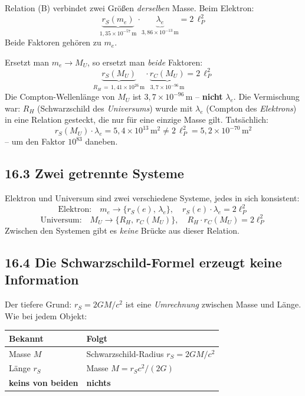 Relation (B) verbindet zwei Größen \emph{derselben} Masse. Beim Elektron:
\[
  \underbrace{r_S(m_e)}_{1{,}35\times10^{-57}\,\text{m}}
  \cdot
  \underbrace{\lambda_e}_{3{,}86\times10^{-13}\,\text{m}}
  = 2\,\ell_P^2
\]
Beide Faktoren gehören zu $m_e$.

Ersetzt man $m_e \to M_U$, so ersetzt man \emph{beide} Faktoren:
\[
  \underbrace{r_S(M_U)}_{R_H \,=\, 1{,}41\times10^{26}\,\text{m}}
  \cdot
  \underbrace{r_C(M_U)}_{3{,}7\times10^{-96}\,\text{m}}
  = 2\,\ell_P^2
\]
Die Compton-Wellenlänge von $M_U$ ist $3{,}7\times10^{-96}$\,m --
\textbf{nicht} $\lambda_e$. Die Vermischung war: $R_H$ (Schwarzschild
des \emph{Universums}) wurde mit $\lambda_e$ (Compton des
\emph{Elektrons}) in eine Relation gesteckt, die nur für eine
einzige Masse gilt. Tatsächlich:
\[
  r_S(M_U)\cdot\lambda_e
  = 5{,}4\times10^{13}\,\text{m}^2
  \neq 2\,\ell_P^2 = 5{,}2\times10^{-70}\,\text{m}^2
\]
-- um den Faktor $10^{83}$ daneben.

\subsection*{16.3 Zwei getrennte Systeme}

Elektron und Universum sind zwei verschiedene Systeme, jedes in sich
konsistent:
\[
  \text{Elektron:}\quad m_e \to \{r_S(e),\,\lambda_e\},
  \quad r_S(e)\cdot\lambda_e = 2\ell_P^2
\]
\[
  \text{Universum:}\quad M_U \to \{R_H,\,r_C(M_U)\},
  \quad R_H\cdot r_C(M_U) = 2\ell_P^2
\]
Zwischen den Systemen gibt es \emph{keine} Brücke aus dieser Relation.

\subsection*{16.4 Die Schwarzschild-Formel erzeugt keine Information}

Der tiefere Grund: $r_S = 2GM/c^2$ ist eine \emph{Umrechnung}
zwischen Masse und Länge. Wie bei jedem Objekt:

\begin{center}
\begin{tabular}{p{4cm}p{8cm}}
\toprule
\textbf{Bekannt} & \textbf{Folgt} \\
\midrule
Masse $M$ & Schwarzschild-Radius $r_S = 2GM/c^2$ \\
Länge $r_S$ & Masse $M = r_S c^2/(2G)$ \\
\textbf{keins von beiden} & \textbf{nichts} \\
\bottomrule
\end{tabular}
\end{center}

